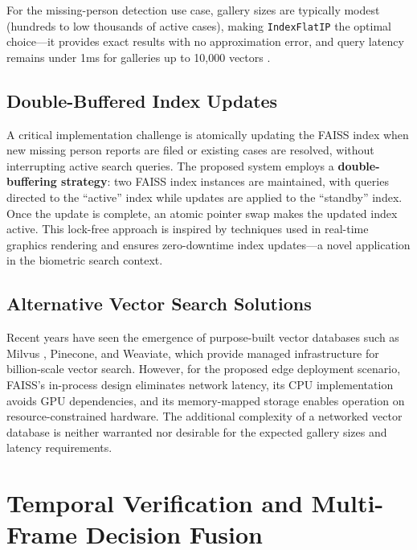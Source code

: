 \documentclass[12pt, a4paper]{article}
\begin{document}
For the missing-person detection use case, gallery sizes are typically modest (hundreds to low thousands of active cases), making \texttt{IndexFlatIP} the optimal choice---it provides exact results with no approximation error, and query latency remains under 1ms for galleries up to 10,000 vectors \cite{johnson2021}.

\subsection{Double-Buffered Index Updates}

A critical implementation challenge is atomically updating the FAISS index when new missing person reports are filed or existing cases are resolved, without interrupting active search queries. The proposed system employs a \textbf{double-buffering strategy}: two FAISS index instances are maintained, with queries directed to the ``active'' index while updates are applied to the ``standby'' index. Once the update is complete, an atomic pointer swap makes the updated index active. This lock-free approach is inspired by techniques used in real-time graphics rendering \cite{abrash1997} and ensures zero-downtime index updates---a novel application in the biometric search context.

\subsection{Alternative Vector Search Solutions}

Recent years have seen the emergence of purpose-built vector databases such as Milvus \cite{wang2021milvus}, Pinecone, and Weaviate, which provide managed infrastructure for billion-scale vector search. However, for the proposed edge deployment scenario, FAISS's in-process design eliminates network latency, its CPU implementation avoids GPU dependencies, and its memory-mapped storage enables operation on resource-constrained hardware. The additional complexity of a networked vector database is neither warranted nor desirable for the expected gallery sizes and latency requirements.


\section{Temporal Verification and Multi-Frame Decision Fusion}
\end{document}
